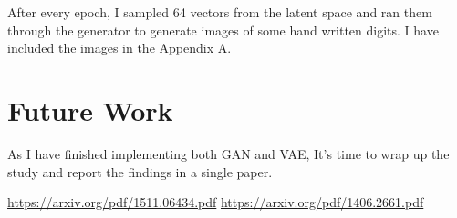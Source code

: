 \documentclass{article}
\begin{document}
After every epoch, I sampled 64 vectors from the latent space and ran them through the generator to generate images of some hand written digits. I have included the images in the \hyperref[generatedimages]{Appendix A}.

\section{Future Work}
As I have finished implementing both GAN and VAE, It's time to wrap up the study and report the findings in a single paper.

\begin{thebibliography}{1}

 \url{https://arxiv.org/pdf/1511.06434.pdf}
 \url{https://arxiv.org/pdf/1406.2661.pdf}

\end{thebibliography}
\appendix
\end{document}
